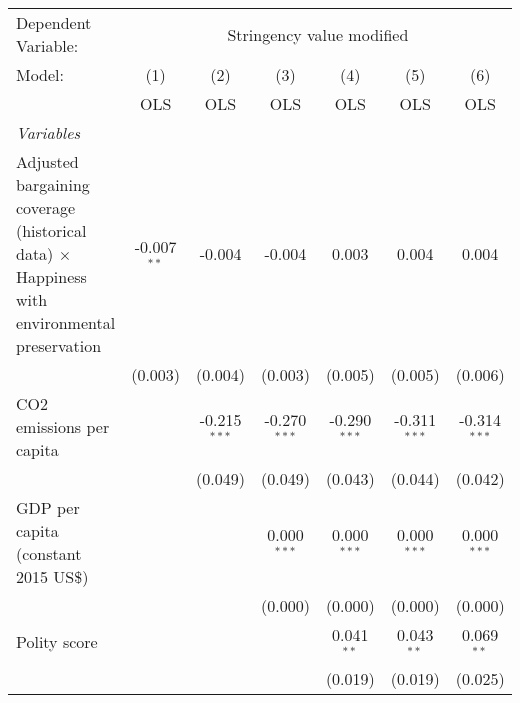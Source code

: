 
\begingroup
\centering
\begin{tabular}{lcccccc}
   \toprule
   Dependent Variable: & \multicolumn{6}{c}{Stringency value modified}\\
   Model:                                                                                             & (1)           & (2)            & (3)            & (4)            & (5)            & (6)\\  
                                                                                                      &  OLS          & OLS            & OLS            & OLS            & OLS            & OLS\\  
   \midrule
   \emph{Variables}\\
   Adjusted bargaining coverage (historical data) $\times$ Happiness with environmental preservation  & -0.007$^{**}$ & -0.004         & -0.004         & 0.003          & 0.004          & 0.004\\   
                                                                                                      & (0.003)       & (0.004)        & (0.003)        & (0.005)        & (0.005)        & (0.006)\\   
   CO2 emissions per capita                                                                           &               & -0.215$^{***}$ & -0.270$^{***}$ & -0.290$^{***}$ & -0.311$^{***}$ & -0.314$^{***}$\\   
                                                                                                      &               & (0.049)        & (0.049)        & (0.043)        & (0.044)        & (0.042)\\   
   GDP per capita (constant 2015 US\$)                                                                &               &                & 0.000$^{***}$  & 0.000$^{***}$  & 0.000$^{***}$  & 0.000$^{***}$\\   
                                                                                                      &               &                & (0.000)        & (0.000)        & (0.000)        & (0.000)\\   
   Polity score                                                                                       &               &                &                & 0.041$^{**}$   & 0.043$^{**}$   & 0.069$^{**}$\\   
                                                                                                      &               &                &                & (0.019)        & (0.019)        & (0.025)\\   

\end{tabular}
